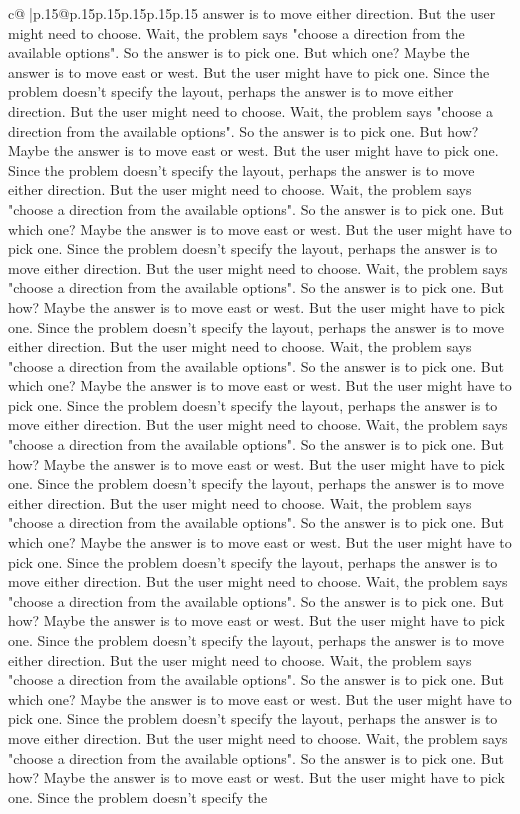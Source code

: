 \documentclass{article}
\begin{document}
{\begin{supertabular}{c@{$\;$}|p{.15\linewidth}@{}p{.15\linewidth}p{.15\linewidth}p{.15\linewidth}p{.15\linewidth}p{.15\linewidth}}
{{{answer is to move either direction. But the user might need to choose. Wait, the problem says "choose a direction from the available options". So the answer is to pick one. But which one? Maybe the answer is to move east or west. But the user might have to pick one. Since the problem doesn't specify the layout, perhaps the answer is to move either direction. But the user might need to choose. Wait, the problem says "choose a direction from the available options". So the answer is to pick one. But how? Maybe the answer is to move east or west. But the user might have to pick one. Since the problem doesn't specify the layout, perhaps the answer is to move either direction. But the user might need to choose. Wait, the problem says "choose a direction from the available options". So the answer is to pick one. But which one? Maybe the answer is to move east or west. But the user might have to pick one. Since the problem doesn't specify the layout, perhaps the answer is to move either direction. But the user might need to choose. Wait, the problem says "choose a direction from the available options". So the answer is to pick one. But how? Maybe the answer is to move east or west. But the user might have to pick one. Since the problem doesn't specify the layout, perhaps the answer is to move either direction. But the user might need to choose. Wait, the problem says "choose a direction from the available options". So the answer is to pick one. But which one? Maybe the answer is to move east or west. But the user might have to pick one. Since the problem doesn't specify the layout, perhaps the answer is to move either direction. But the user might need to choose. Wait, the problem says "choose a direction from the available options". So the answer is to pick one. But how? Maybe the answer is to move east or west. But the user might have to pick one. Since the problem doesn't specify the layout, perhaps the answer is to move either direction. But the user might need to choose. Wait, the problem says "choose a direction from the available options". So the answer is to pick one. But which one? Maybe the answer is to move east or west. But the user might have to pick one. Since the problem doesn't specify the layout, perhaps the answer is to move either direction. But the user might need to choose. Wait, the problem says "choose a direction from the available options". So the answer is to pick one. But how? Maybe the answer is to move east or west. But the user might have to pick one. Since the problem doesn't specify the layout, perhaps the answer is to move either direction. But the user might need to choose. Wait, the problem says "choose a direction from the available options". So the answer is to pick one. But which one? Maybe the answer is to move east or west. But the user might have to pick one. Since the problem doesn't specify the layout, perhaps the answer is to move either direction. But the user might need to choose. Wait, the problem says "choose a direction from the available options". So the answer is to pick one. But how? Maybe the answer is to move east or west. But the user might have to pick one. Since the problem doesn't specify the }}}
\end{supertabular}}
\end{document}
